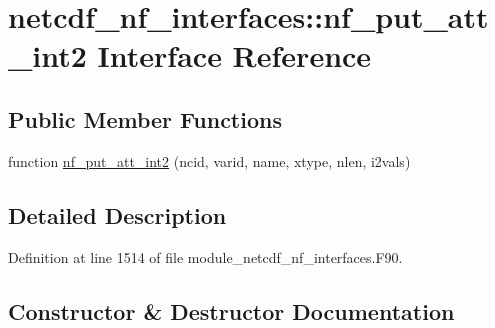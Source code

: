 \hypertarget{interfacenetcdf__nf__interfaces_1_1nf__put__att__int2}{}\section{netcdf\+\_\+nf\+\_\+interfaces\+:\+:nf\+\_\+put\+\_\+att\+\_\+int2 Interface Reference}
\label{interfacenetcdf__nf__interfaces_1_1nf__put__att__int2}
\subsection*{Public Member Functions}
\begin{DoxyCompactItemize}
\item 
function \hyperlink{interfacenetcdf__nf__interfaces_1_1nf__put__att__int2_a9894daf88d84eb4a80bc6d4209aee142}{nf\+\_\+put\+\_\+att\+\_\+int2} (ncid, varid, name, xtype, nlen, i2vals)
\end{DoxyCompactItemize}


\subsection{Detailed Description}


Definition at line 1514 of file module\+\_\+netcdf\+\_\+nf\+\_\+interfaces.\+F90.



\subsection{Constructor \& Destructor Documentation}
\mbox{\label{interfacenetcdf__nf__interfaces_1_1nf__put__att__int2_a9894daf88d84eb4a80bc6d4209aee142}} 
